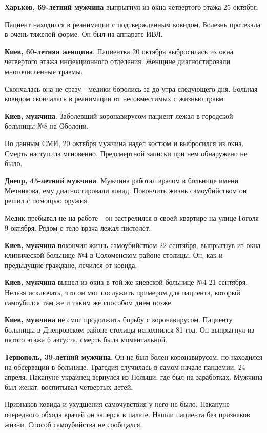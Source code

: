 \textbf{Харьков, 69-летний мужчина} выпрыгнул из окна четвертого этажа 25 октября. 

Пациент находился в реанимации с подтвержденным ковидом. Болезнь протекала
в очень тяжелой форме. Он был на аппарате ИВЛ.

\textbf{Киев, 60-летняя женщина}. Пациентка 20 октября выбросилась из
окна четвертого этажа инфекционного отделения. Женщине диагностировали
многочисленные травмы.

Скончалась она не сразу - медики боролись за до утра следующего
дня. Больная ковидом скончалась в реанимации от несовместимых с жизнью
травм. 

\textbf{Киев, мужчина}. Заболевший коронавирусом пациент лежал в городской
больницы №8 на Оболони. 

По данным СМИ, 20 октября мужчина надел костюм и выбросился из окна.
Смерть наступила мгновенно. Предсмертной записки при нем обнаружено не
было. 

\textbf{Днепр, 45-летний мужчина}. Мужчина работал врачом в больнице имени
Мечникова, ему диагностировали ковид. Покончить жизнь самоубийством он
решил с помощью оружия. 

Медик пребывал не на работе - он застрелился в своей квартире на улице
Гоголя 9 октября. Рядом с тело врача лежал пистолет. 

\textbf{Киев, мужчина} покончил жизнь самоубийством 22 сентября, выпрыгнув из окна
клинической больнице №4 в Соломенском районе столицы. Он, как и предыдущие
граждане, лечился от ковида. 

\textbf{Киев, мужчина} вышел из окна в той же киевской больнице №4 21 сентября.
Нельзя исключать, что он мог послужить примером для пациента, который
самоубился там же и таким же способом днем позже. 

\textbf{Киев, мужчина} не смог продолжить борьбу с коронавирусом. Пациенту больницы
в Днепровском районе столицы исполнился 81 год. Он выпрыгнул из пятого
этажа 6 августа, смерть была моментальной. 

\textbf{Тернополь, 39-летний мужчина}. Он не был болен коронавирусом, но находился
на обсервации в больнице. Трагедия случилась в самом начале пандемии, 24
апреля. Накануне украинец вернулся из Польши, где был на заработках.
Мужчина был женат, воспитывал четвертых детей.

Признаков ковида и ухудшения самочувствия у него не было. Накануне
очередного обхода врачей он заперся в палате. Нашли пациента без признаков
жизни. Способ самоубийства не сообщался. 

